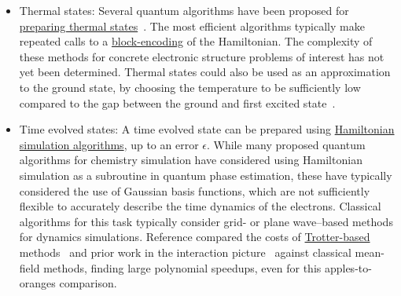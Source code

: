 \begin{refsection}
\begin{itemize}
    \item Thermal states: Several quantum algorithms have been proposed for \hyperref[prim:GibbsSampling]{preparing thermal states}~\cite{poulin2009GibbsSamplingAndEval,chowdhury2016QGibbsSampling,temme2011quantumMetropolis,chen2023QThermalStatePrep}. The most efficient algorithms typically make repeated calls to a \hyperref[prim:BlockEncodings]{block-encoding} of the Hamiltonian. The complexity of these methods for concrete electronic structure problems of interest has not yet been determined. Thermal states could also be used as an approximation to the ground state, by choosing the temperature to be sufficiently low compared to the gap between the ground and first excited state~\cite{chen2023QThermalStatePrep}.

    \item Time evolved states: A time evolved state can be prepared using \hyperref[prim:HamiltonianSimulation]{Hamiltonian simulation algorithms}, up to an error $\epsilon$. While many proposed quantum algorithms for chemistry simulation have considered using Hamiltonian simulation as a subroutine in quantum phase estimation, these have typically considered the use of Gaussian basis functions, which are not sufficiently flexible to accurately describe the time dynamics of the electrons. Classical algorithms for this task typically consider grid- or plane wave--based methods for dynamics simulations. Reference \cite{Babbush2023Dynamics} compared the costs of \hyperref[prim:ProductFormulae]{Trotter-based} methods~\cite{kassal2008QuantumSimChemicalDynamics} and prior work in the interaction picture~\cite{babbush2019FirstQuantizedSublinear,su2021FaultTolerantChemistryFirstQuantized,low2018HamiltonianInteractionPicture} against classical mean-field methods, finding large polynomial speedups, even for this apples-to-oranges comparison.
\end{itemize}







\end{refsection}
